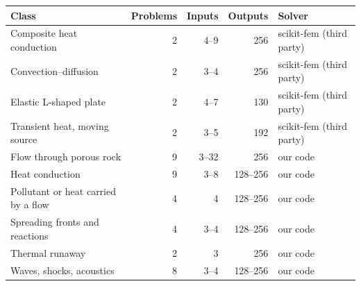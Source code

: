 \begin{tabular}{lrrrl}
\toprule
Class & Problems & Inputs & Outputs & Solver \\
\midrule
Composite heat conduction & 2 & 4--9 & 256 & scikit-fem (third party) \\
Convection--diffusion & 2 & 3--4 & 256 & scikit-fem (third party) \\
Elastic L-shaped plate & 2 & 4--7 & 130 & scikit-fem (third party) \\
Transient heat, moving source & 2 & 3--5 & 192 & scikit-fem (third party) \\
Flow through porous rock & 9 & 3--32 & 256 & our code \\
Heat conduction & 9 & 3--8 & 128--256 & our code \\
Pollutant or heat carried by a flow & 4 & 4 & 128--256 & our code \\
Spreading fronts and reactions & 4 & 3--4 & 128--256 & our code \\
Thermal runaway & 2 & 3 & 256 & our code \\
Waves, shocks, acoustics & 8 & 3--4 & 128--256 & our code \\
\bottomrule
\end{tabular}
